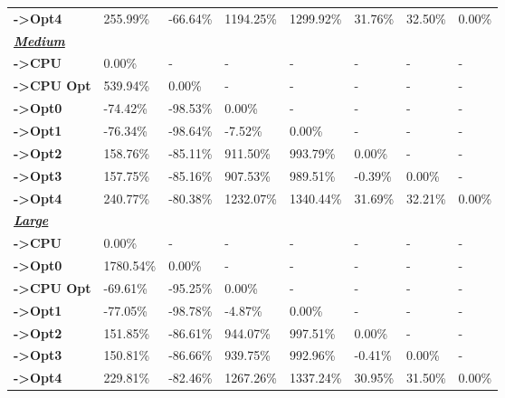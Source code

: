 \begin{table}[H]
\begin{tabular}{llllllll}
    \rowcolor[HTML]{EFEFEF} \cellcolor[HTML]{DAE8FC} \textbf{->Opt4} & 255.99\% & -66.64\% & 1194.25\% & 1299.92\% & 31.76\% & 	32.50\% & 	0.00\% \\
    \cellcolor[HTML]{DAE8FC} \textbf{\textbf{{\emph{{\underline{{Medium}}}}}}} &  &  &  &  &  &  &  \\
    \rowcolor[HTML]{EFEFEF} \cellcolor[HTML]{DAE8FC} \textbf{->CPU} & 0.00\% & - & - & - & - & - & - \\
    \cellcolor[HTML]{DAE8FC} \textbf{->CPU Opt} & 539.94\% & 0.00\% & - & - & - & - & - \\
    \rowcolor[HTML]{EFEFEF} \cellcolor[HTML]{DAE8FC} \textbf{->Opt0} & -74.42\% & -98.53\% & 0.00\% & - & - & - & - \\
    \cellcolor[HTML]{DAE8FC} \textbf{->Opt1} & -76.34\% & -98.64\% & -7.52\% & 0.00\% & - & - & - \\
    \rowcolor[HTML]{EFEFEF} \cellcolor[HTML]{DAE8FC} \textbf{->Opt2} & 158.76\% & -85.11\% & 911.50\% & 993.79\% & 0.00\% & - & - \\
    \cellcolor[HTML]{DAE8FC} \textbf{->Opt3} & 157.75\% & -85.16\% & 907.53\% & 989.51\% & -0.39\% & 	0.00\% & - \\
    \rowcolor[HTML]{EFEFEF} \cellcolor[HTML]{DAE8FC} \textbf{->Opt4} & 240.77\% & -80.38\% & 1232.07\% & 1340.44\% & 31.69\% & 	32.21\% & 	0.00\% \\
    \cellcolor[HTML]{DAE8FC} \textbf{\textbf{{\emph{{\underline{{Large}}}}}}} &  &  &  &  &  &  &  \\
    \rowcolor[HTML]{EFEFEF} \cellcolor[HTML]{DAE8FC} \textbf{->CPU} & 0.00\% & - & - & - & - & - & - \\
    \cellcolor[HTML]{DAE8FC} \textbf{->Opt0} & 1780.54\% & 0.00\% & - & - & - & - & - \\
    \rowcolor[HTML]{EFEFEF} \cellcolor[HTML]{DAE8FC} \textbf{->CPU Opt} & -69.61\% & -95.25\% & 0.00\% & - & - & - & - \\
    \cellcolor[HTML]{DAE8FC} \textbf{->Opt1} & -77.05\% & -98.78\% & -4.87\% & 0.00\% & - & - & - \\
    \rowcolor[HTML]{EFEFEF} \cellcolor[HTML]{DAE8FC} \textbf{->Opt2} & 151.85\% & -86.61\% & 944.07\% & 997.51\% & 0.00\% & - & - \\
    \cellcolor[HTML]{DAE8FC} \textbf{->Opt3} & 150.81\% & -86.66\% & 939.75\% & 992.96\% & -0.41\% & 	0.00\% & - \\
    \rowcolor[HTML]{EFEFEF} \cellcolor[HTML]{DAE8FC} \textbf{->Opt4} & 229.81\% & -82.46\% & 1267.26\% & 1337.24\% & 30.95\% & 	31.50\% & 	0.00\% \\

\end{tabular}
\end{table}
